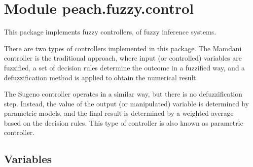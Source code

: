 %
%
%


\section{Module peach.fuzzy.control}

    \label{peach:fuzzy:control}

This package implements fuzzy controllers, of fuzzy inference systems.

There are two types of controllers implemented in this package. The Mamdani
controller is the traditional approach, where input (or controlled) variables
are fuzzified, a set of decision rules determine the outcome in a fuzzified way,
and a defuzzification method is applied to obtain the numerical result.

The Sugeno controller operates in a similar way, but there is no defuzzification
step. Instead, the value of the output (or manipulated) variable is determined
by parametric models, and the final result is determined by a weighted average
based on the decision rules. This type of controller is also known as parametric
controller.


  \subsection{Variables}

